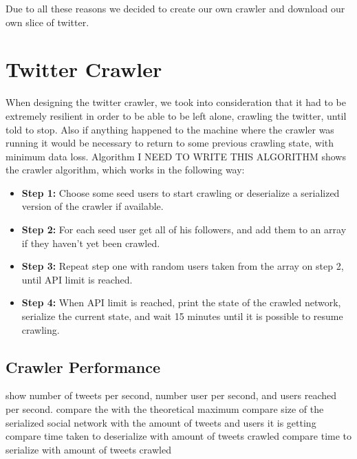 Due to all these reasons we decided to create our own crawler and download our own slice of twitter.

\section{Twitter Crawler}
\label{sec:twitter_crawler}
When designing the twitter crawler, we took into consideration that it had to be extremely resilient in order to be able to be left alone, crawling the twitter, until told to stop. Also if anything happened to the machine where the crawler was running it would be necessary to return to some previous crawling state, with minimum data loss. Algorithm {\color{red} I NEED TO WRITE THIS ALGORITHM } shows the crawler algorithm, which works in the following way:

\begin{itemize}
  \item \textbf{Step 1:} Choose some seed users to start crawling or deserialize a serialized version of the crawler if available.
  \item \textbf{Step 2:} For each seed user get all of his followers, and add them to an array if they haven't yet been crawled.
  \item \textbf{Step 3:} Repeat step one with random users taken from the array on step 2, until API limit is reached.
  \item \textbf{Step 4:} When API limit is reached, print the state of the crawled network, serialize the current state, and wait 15 minutes until it is possible to resume crawling. 
\end{itemize}

\subsection{Crawler Performance}
\label{sub:crawler_performance}
{\color{red} show number of tweets per second, number user per second, and users reached per second. }
{\color{red} compare the with the theoretical maximum }
{\color{red} compare size of the serialized social network with the amount of tweets and users it is getting  }
{\color{red} compare time taken to deserialize with amount of tweets crawled }
{\color{red} compare time to serialize with amount of tweets crawled }


